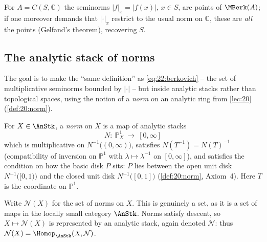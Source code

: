\begin{example}
\label{ex:22:berkovich-CS}
For $A=C(S,\mathbb C)$ the seminorms $|f|_x=|f(x)|$, $x\in S$, are points of
$\MBerk(A)$; if one moreover demands that $|\cdot|_x$ restrict to the usual norm
on $\mathbb C$, these are \emph{all} the points (Gelfand's theorem), recovering
$S$.
\end{example}

\subsection{The analytic stack of norms}
\label{subsec:22:norms}

The goal is to make the ``same definition'' as \eqref{eq:22:berkovich} -- the
set of multiplicative seminorms bounded by $|\cdot|$ -- but inside analytic
stacks rather than topological spaces, using the notion of a \emph{norm} on an
analytic ring from \cref{lec:20} (\cref{def:20:norm}).

\begin{definition}
\label{def:22:norm}
For $X\in\AnStk$, a \emph{norm} on $X$ is a map of analytic stacks
\begin{equation*}
N\colon\ \mathbb P^1_X\ \longrightarrow\ [0,\infty]
\end{equation*}
which is multiplicative on $N^{-1}\bigl((0,\infty)\bigr)$, satisfies
$N(T^{-1})=N(T)^{-1}$ (compatibility of inversion on $\mathbb P^1$ with
$\lambda\mapsto\lambda^{-1}$ on $[0,\infty]$), and satisfies the condition on
how the basic disk $P$ sits: $P$ lies between the open unit disk
$N^{-1}\bigl([0,1)\bigr)$ and the closed unit disk $N^{-1}\bigl([0,1]\bigr)$
(\cref{def:20:norm}, Axiom~4). Here $T$ is the coordinate on $\mathbb P^1$.
\end{definition}

\begin{notation}
\label{not:22:stack-of-norms}
Write $\mathcal N(X)$ for the set of norms on $X$. This is genuinely a set, as it
is a set of maps in the locally small category $\AnStk$. Norms satisfy descent,
so $X\mapsto\mathcal N(X)$ is represented by an analytic stack, again denoted
$\mathcal N$: thus $\mathcal N(X)=\Homop_{\AnStk}(X,\mathcal N)$.
\end{notation}

